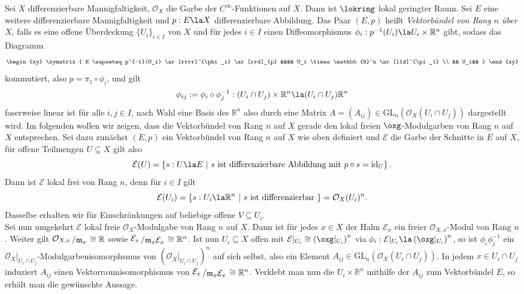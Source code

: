 \documentclass[11pt]{book}
\theoremstyle{nonumberbreak}
\newenvironment{ex}[1][]{\ifthenelse{\equal{#1}{}}{\example}{\example[#1]}\rm}{\endexample}
\newenvironment{definprop}[1][]{\ifthenelse{\equal{#1}{}}{\definiprop}{\definiprop[#1]}\rm}{\enddefiniprop}
\newcommand{\slant}[2]{{\raisebox{.1em}{$#1$}\left/\raisebox{-.1em}{$#2$}\right.}}
\begin{document}
\begin{spacing}{1.4}
\begin{definprop}
\end{definprop}




\begin{ex}
Sei $X$ differenzierbare Mannigfaltigkeit, $\mathcal{O}_X$ die Garbe der $C^{\infty}$-Funktionen auf $X$. Dann ist $\lokring$ lokal geringter Raum. Sei $E$ eine weitere differenzierbare Mannigfaltigkeit und $p: E \la X$ differenzierbare Abbildung. Das Paar $(E,p)$ heißt \textit{Vektorbündel von Rang $n$ über $X$}, falls es eine offene Überdeckung $\{U_i\}_{i \in I}$ von $X$ und für jedes $i \in I$ einen Diffeomorphismus $\phi_i: p^{-1}(U_i) \la U_i \times \mathbb{R}^n$ gibt, sodass das Diagramm
$$
\begin{xy}
\xymatrix{
E \supseteq p^{-1}(U_i) \ar[rrrr]^{\phi_i}  \ar[rrd]_{p} &&&& U_i \times \mathbb{R}^n \ar[lld]^{\pi_1} \\
&& U_i&&
}
\end{xy}
$$
kommutiert, also $p = \pi_1 \circ \phi_i$, und gilt
$$\phi_{ij} := \phi_i \circ \phi_j^{-1}: \left(U_i \cap U_j\right) \times \mathbb{R}^n \la (U_i \cap U_j) \mathbb{R}^n$$
faserweise linear ist für alle $i,j \in I$, nach Wahl eine Basis des $\mathbb{R}^n$ also durch eine Matrix $A=(A_{ij}) \in \mathrm{GL}_n\left(\mathcal{O}_X(U_i \cap U_j)\right)$ dargestellt wird. Im folgenden wollen wir zeigen, dass die Vektorbündel von Rang $n$ auf $X$ gerade den lokal freien $\oxg$-Modulgarben von Rang $n$ auf $X$ entsprechen. Sei dazu zunächst $(E,p)$ ein Vektorbündel von Rang $n$ auf $X$ wie oben definiert und $\mathcal{E}$ die Garbe der Schnitte in $E$ auf $X$, für offene Teilmengen $U \subseteq X$ gilt also 
$$\mathcal{E}(U) = \left\{s: U \la E \ \vert \ s \textrm{ ist differenzierbare Abbildung mit } p \circ s = \mathrm{id}_U \right\}.$$
Dann ist $\mathcal{E}$ lokal frei von Rang $n$, denn für $i \in I$ gilt
$$\mathcal{E}(U_i) = \left\{ s: U_i \la \mathbb{R}^n \ \vert \ s \textrm{ ist differenzierbar } \right\} = \mathcal{O}_X(U_i)^n.$$
Dasselbe erhalten wir für Einschränkungen auf beliebige offene $V \subseteq U_i$.\\
Sei nun umgekehrt $\mathcal{E}$ lokal freie $\mathcal{O}_X$-Modulgabe von Rang $n$ auf $X$. Dann ist für jedes $x \in X$ der Halm $\mathcal{E}_x$ ein freier $\mathcal{O}_{X,x}$-Modul von Rang $n$. Weiter gilt $\slant{\mathcal{O}_{X,x}}{\mathfrak{m}_x} \cong \mathbb{R}$ sowie $\slant{\mathcal{E}_x}{\mathfrak{m}_x \mathcal{E}_x} \cong \mathbb{R}^n$. Ist nun $U_i\subseteq X$ offen mit $\mathcal{E}\vert_{U_i} \cong \left( \oxg \vert_{U_i}\right)^n$ via $\phi_i: \mathcal{E}\vert_{U_i} \la \left( \oxg\vert_{U_i}\right)^n$, so ist $\phi_i \phi_j^{-1}$ ein $\mathcal{O}_X\vert_{U_i \cap U_j}$-Modulgarbenisomorphsmus von $\left( \mathcal{O}_X \vert_{U_i \cap U_j} \right)^n$ auf sich selbst, also ein Element $A_{ij} \in \mathrm{GL}_n\left(\mathcal{O}_X(U_i \cap U_j)\right)$. In jedem $x \in U_i \cap U_j$ induziert $A_{ij}$ einen Vektorraumisomorphismus von $\slant{\mathcal{E}_x}{\mathfrak{m}_x\mathcal{E}_x} \cong \mathbb{R}^n$. Verklebt man nun die $U_i \times \mathbb{R}^n$ mithilfe der $A_{ij}$ zum Vektorbündel $E$, so erhält man die gewünschte Aussage.



\end{ex}
\end{spacing}
\end{document}
